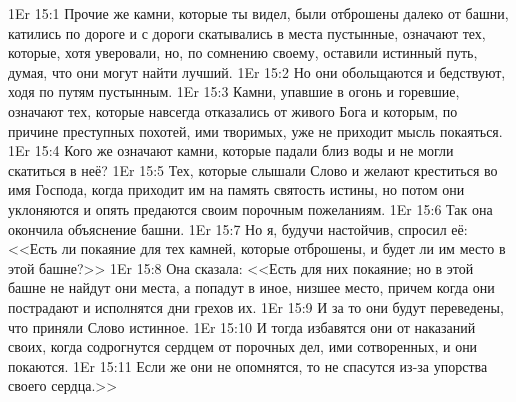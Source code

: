 \vs 1Er 15:1
Прочие же камни, которые
ты видел, были отброшены далеко от башни, катились по дороге и с дороги
скатывались в места пустынные, означают тех, которые, хотя уверовали, но, по
сомнению своему, оставили истинный путь, думая, что они могут найти лучший.
\vs 1Er 15:2
Но они обольщаются и бедствуют, ходя по путям пустынным.
\vs 1Er 15:3
Камни, упавшие в огонь и
горевшие, означают тех, которые навсегда отказались от живого Бога и которым,
по причине преступных похотей, ими творимых, уже не приходит мысль покаяться.
\vs 1Er 15:4
Кого же означают камни,
которые падали близ воды и не могли скатиться в неё?
\vs 1Er 15:5
Тех, которые слышали Слово
и желают креститься во имя Господа, когда приходит им на память святость
истины, но потом они уклоняются и опять предаются своим порочным пожеланиям.
\vs 1Er 15:6
Так она окончила объяснение башни.
\vs 1Er 15:7
Но я, будучи настойчив, спросил её:
<<Есть ли покаяние для тех камней, которые отброшены,
и будет ли им место в этой башне?>>
\vs 1Er 15:8
Она сказала:
<<Есть для них покаяние; но в этой башне не найдут они места,
а попадут в иное, низшее место,
причем когда они пострадают и исполнятся дни грехов их.
\vs 1Er 15:9
И за то они будут
переведены, что приняли Слово истинное.
\vs 1Er 15:10
И тогда избавятся они от
наказаний своих, когда содрогнутся сердцем от порочных дел,
ими сотворенных, и они покаются.
\vs 1Er 15:11
Если же они не опомнятся,
то не спасутся из-за упорства своего сердца.>>

